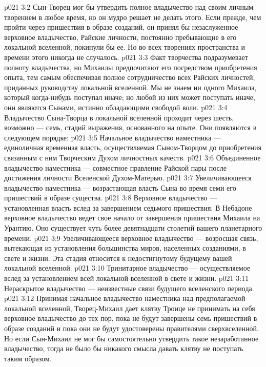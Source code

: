 \vs p021 3:2 \pc Сын\hyp{}Творец мог бы утвердить полное владычество над своим личным творением в любое время, но он мудро решает не делать этого. Если прежде, чем пройти через пришествия в образе созданий, он принял бы незаслуженное верховное владычество, Райские личности, постоянно пребывающие в его локальной вселенной, покинули бы ее. Но во всех творениях пространства и времени этого никогда не случалось.
\vs p021 3:3 Факт творчества подразумевает полноту владычества, но Михаилы предпочитают  его посредством приобретения опыта, тем самым обеспечивая полное сотрудничество всех Райских личностей, приданных руководству локальной вселенной. Мы не знаем ни одного Михаила, который когда\hyp{}нибудь поступал иначе; но любой из них может поступать иначе, они являются Сынами, истинно обладающими свободой воли.
\vs p021 3:4 \pc Владычество Сына\hyp{}Творца в локальной вселенной проходит через шесть, возможно --- семь, стадий выражения, основанного на опыте. Они появляются в следующем порядке:
\vs p021 3:5 \bibnobreakspace Начальное владычество наместника --- единоличная временная власть, осуществляемая Сыном\hyp{}Творцом до приобретения связанным с ним Творческим Духом личностных качеств.
\vs p021 3:6 \bibnobreakspace Объединенное владычество наместника --- совместное правление Райской пары после достижения личности Вселенской Духом\hyp{}Матерью.
\vs p021 3:7 \bibnobreakspace Увеличивающееся владычество наместника --- возрастающая власть Сына во время семи его пришествий в образе существа.
\vs p021 3:8 \bibnobreakspace Верховное владычество --- установленная власть вслед за завершением седьмого пришествия. В Небадоне верховное владычество ведет свое начало от завершения пришествия Михаила на Урантию. Оно существует чуть более девятнадцати столетий вашего планетарного времени.
\vs p021 3:9 \bibnobreakspace Увеличивающееся верховное владычество --- возросшая связь, вытекающая из установления большинства миров, населенных созданиями, в свете и жизни. Эта стадия относится к недостигнутому будущему вашей локальной вселенной.
\vs p021 3:10 \bibnobreakspace Тринитарное владычество --- осуществляемое вслед за установлением всей локальной вселенной в свете и жизни.
\vs p021 3:11 \bibnobreakspace Нераскрытое владычество --- неизвестные связи будущего вселенского периода.
\vs p021 3:12 \pc Принимая начальное владычество наместника над предполагаемой локальной вселенной, Творец\hyp{}Михаил дает клятву Троице не принимать на себя верховное владычество до тех пор, пока не будут завершены семь пришествий в образе созданий и пока они не будут удостоверены правителями сверхвселенной. Но если Сын\hyp{}Михаил не мог бы самостоятельно утвердить такое незаработанное владычество, тогда не было бы никакого смысла давать клятву не поступать таким образом.
